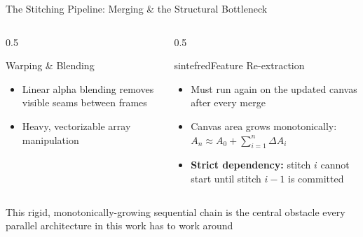 \documentclass{beamer}
\begin{document}
\begin{frame}{The Stitching Pipeline: Merging \& the Structural Bottleneck}
  \begin{columns}
    \begin{column}{0.5\textwidth}
      \begin{block}{Warping \& Blending}
        \begin{itemize}
          \item Linear alpha blending removes visible seams between frames
          \item Heavy, vectorizable array manipulation
        \end{itemize}
      \end{block}
    \end{column}
    \begin{column}{0.5\textwidth}
      \begin{colorblock}[white]{sintefred}{Feature Re-extraction}
        \begin{itemize}
          \item Must run again on the updated canvas after every merge
          \item Canvas area grows monotonically: $A_n \approx A_0 + \sum_{i=1}^n \Delta A_i$
          \item \textbf{Strict dependency:} stitch $i$ cannot start until stitch $i-1$ is committed
        \end{itemize}
      \end{colorblock}
    \end{column}
  \end{columns}
  \vspace{0.3cm}
  This rigid, monotonically-growing sequential chain is the central obstacle every parallel architecture in this work has to work around
\end{frame}
\end{document}
